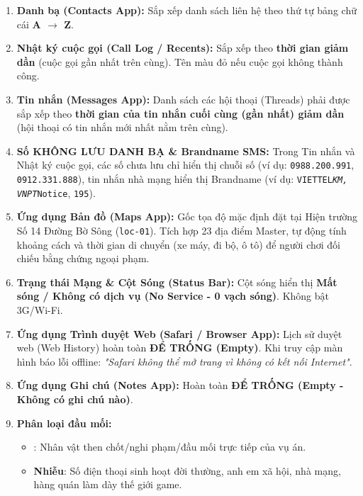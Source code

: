 \documentclass[12pt,a4paper]{article}
\begin{document}
\begin{enumerate}[label=\arabic*., leftmargin=*, itemsep=2pt, topsep=2pt, parsep=0pt]
  \item \textbf{Danh bạ (Contacts App):} Sắp xếp danh sách liên hệ theo thứ tự bảng chữ cái \textbf{A $\rightarrow$ Z}.
  \item \textbf{Nhật ký cuộc gọi (Call Log / Recents):} Sắp xếp theo \textbf{thời gian giảm dần} (cuộc gọi gần nhất trên cùng). Tên màu đỏ nếu cuộc gọi không thành công.
  \item \textbf{Tin nhắn (Messages App):} Danh sách các hội thoại (Threads) phải được sắp xếp theo \textbf{thời gian của tin nhắn cuối cùng (gần nhất) giảm dần} (hội thoại có tin nhắn mới nhất nằm trên cùng).
  \item \textbf{Số KHÔNG LƯU DANH BẠ \& Brandname SMS:} Trong Tin nhắn và Nhật ký cuộc gọi, các số chưa lưu chỉ hiển thị chuỗi số (ví dụ: \texttt{0988.200.991}, \texttt{0912.331.888}), tin nhắn nhà mạng hiển thị Brandname (ví dụ: \texttt{VIETTEL\textit{KM\texttt{, }VNPT}Notice}, \texttt{195}).
  \item \textbf{Ứng dụng Bản đồ (Maps App):} Gốc tọa độ mặc định đặt tại Hiện trường Số 14 Đường Bờ Sông (\texttt{loc-01}). Tích hợp 23 địa điểm Master, tự động tính khoảng cách và thời gian di chuyển (xe máy, đi bộ, ô tô) để người chơi đối chiếu bằng chứng ngoại phạm.
  \item \textbf{Trạng thái Mạng \& Cột Sóng (Status Bar):} Cột sóng hiển thị \textbf{Mất sóng / Không có dịch vụ (No Service - 0 vạch sóng)}. Không bật 3G/Wi-Fi.
  \item \textbf{Ứng dụng Trình duyệt Web (Safari / Browser App):} Lịch sử duyệt web (Web History) hoàn toàn \textbf{ĐỂ TRỐNG (Empty)}. Khi truy cập màn hình báo lỗi offline: \textit{"Safari không thể mở trang vì không có kết nối Internet"}.
  \item \textbf{Ứng dụng Ghi chú (Notes App):} Hoàn toàn \textbf{ĐỂ TRỐNG (Empty - Không có ghi chú nào)}.
  \item \textbf{Phân loại đầu mối:}
\begin{itemize}[leftmargin=*, itemsep=2pt, topsep=2pt, parsep=0pt]
  \item : Nhân vật then chốt/nghi phạm/đầu mối trực tiếp của vụ án.
  \item \textbf{Nhiễu}: Số điện thoại sinh hoạt đời thường, anh em xã hội, nhà mạng, hàng quán làm dày thế giới game.


\end{itemize}
\end{enumerate}
\end{document}
